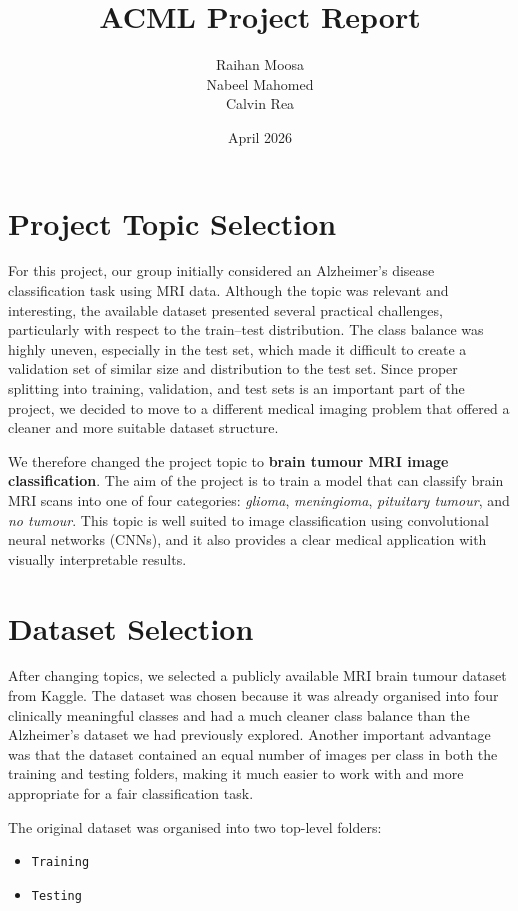\documentclass{article}
\title{ACML Project Report}
\author{Raihan Moosa \\ Nabeel Mahomed \\ Calvin Rea}
\date{April 2026}
\begin{document}
\maketitle

\section{Project Topic Selection}

For this project, our group initially considered an Alzheimer's disease classification task using MRI data. Although the topic was relevant and interesting, the available dataset presented several practical challenges, particularly with respect to the train--test distribution. The class balance was highly uneven, especially in the test set, which made it difficult to create a validation set of similar size and distribution to the test set. Since proper splitting into training, validation, and test sets is an important part of the project, we decided to move to a different medical imaging problem that offered a cleaner and more suitable dataset structure.

We therefore changed the project topic to \textbf{brain tumour MRI image classification}. The aim of the project is to train a model that can classify brain MRI scans into one of four categories: \textit{glioma}, \textit{meningioma}, \textit{pituitary tumour}, and \textit{no tumour}. This topic is well suited to image classification using convolutional neural networks (CNNs), and it also provides a clear medical application with visually interpretable results.

\section{Dataset Selection}

After changing topics, we selected a publicly available MRI brain tumour dataset from Kaggle. The dataset was chosen because it was already organised into four clinically meaningful classes and had a much cleaner class balance than the Alzheimer's dataset we had previously explored. Another important advantage was that the dataset contained an equal number of images per class in both the training and testing folders, making it much easier to work with and more appropriate for a fair classification task.

The original dataset was organised into two top-level folders:

\begin{itemize}
    \item \texttt{Training}
    \item \texttt{Testing}
\end{itemize}
\end{document}
